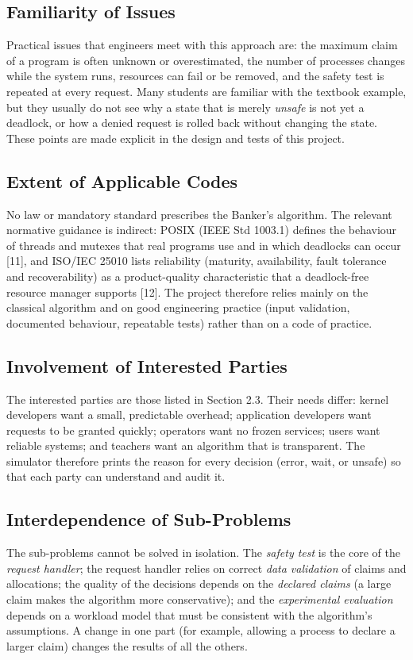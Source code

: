 \documentclass[11pt,a4paper]{report}
\begin{document}
\subsection{Familiarity of Issues}
Practical issues that engineers meet with this approach are: the maximum claim of a program is often unknown or overestimated, the number of processes changes while the system runs, resources can fail or be removed, and the safety test is repeated at every request. Many students are familiar with the textbook example, but they usually do not see why a state that is merely \emph{unsafe} is not yet a deadlock, or how a denied request is rolled back without changing the state. These points are made explicit in the design and tests of this project.

\subsection{Extent of Applicable Codes}
No law or mandatory standard prescribes the Banker's algorithm. The relevant normative guidance is indirect: POSIX (IEEE Std 1003.1) defines the behaviour of threads and mutexes that real programs use and in which deadlocks can occur [11], and ISO/IEC 25010 lists reliability (maturity, availability, fault tolerance and recoverability) as a product-quality characteristic that a deadlock-free resource manager supports [12]. The project therefore relies mainly on the classical algorithm and on good engineering practice (input validation, documented behaviour, repeatable tests) rather than on a code of practice.

\subsection{Involvement of Interested Parties}
The interested parties are those listed in Section 2.3. Their needs differ: kernel developers want a small, predictable overhead; application developers want requests to be granted quickly; operators want no frozen services; users want reliable systems; and teachers want an algorithm that is transparent. The simulator therefore prints the reason for every decision (error, wait, or unsafe) so that each party can understand and audit it.

\subsection{Interdependence of Sub-Problems}
The sub-problems cannot be solved in isolation. The \emph{safety test} is the core of the \emph{request handler}; the request handler relies on correct \emph{data validation} of claims and allocations; the quality of the decisions depends on the \emph{declared claims} (a large claim makes the algorithm more conservative); and the \emph{experimental evaluation} depends on a workload model that must be consistent with the algorithm's assumptions. A change in one part (for example, allowing a process to declare a larger claim) changes the results of all the others.
\end{document}
